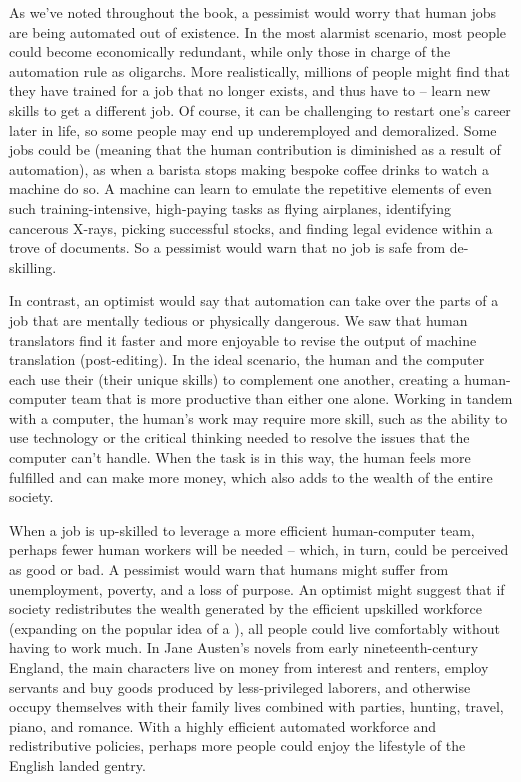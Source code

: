 As we've noted throughout the book, a pessimist would worry that human jobs are being automated out of existence.  In the most alarmist scenario, most people could become economically redundant, while only those in charge of the automation rule as oligarchs.  More realistically, millions of people might find that they have trained for a job that no longer exists, and thus  have to  -- learn new skills to get a different job.  Of course, it can be challenging to restart one's career later in life, so some people may end up underemployed and demoralized.
Some jobs could be  (meaning that the human contribution  is diminished as a result of automation), as when a barista stops making bespoke coffee drinks  to   watch a machine do so.
 A machine can learn to  emulate the repetitive elements of even such training-intensive, high-paying tasks as flying airplanes, identifying cancerous X-rays, picking successful stocks, and finding legal evidence within a trove of documents.  So a pessimist would warn that no job is safe from de-skilling.  
 
 In contrast, an optimist would say that automation can take over the parts of a job that are mentally tedious or physically dangerous.  We saw that human translators find it faster and more enjoyable to revise the output of machine translation (post-editing).  In the ideal scenario, the human and the computer each use their  (their unique skills) to complement one another, creating a human-computer team that is more productive than either one alone.  Working in tandem with a computer, the human's work may require more skill, such as the ability to use technology or the critical thinking needed to resolve the issues that the computer can't handle.  When the task is  in this way, the human feels more fulfilled and can make more money, which also  adds to the wealth of the entire society.

When a job is up-skilled to leverage a more efficient human-computer team, perhaps fewer human workers will be needed -- which, in turn, could be perceived as good or bad.  A pessimist would warn that humans might suffer from unemployment,  poverty, and a loss of purpose.  An optimist might suggest that if society redistributes the wealth generated by the efficient upskilled workforce (expanding on the popular idea of a ), all people could live comfortably without having to work much.  In Jane Austen's novels from early nineteenth-century England, the main characters live on money from interest and renters, employ servants and buy goods produced by less-privileged laborers, and otherwise occupy themselves with their family lives combined with parties, hunting, travel, piano, and romance.  With a highly efficient automated workforce and redistributive policies, perhaps more people could enjoy the lifestyle of the English landed gentry.  

